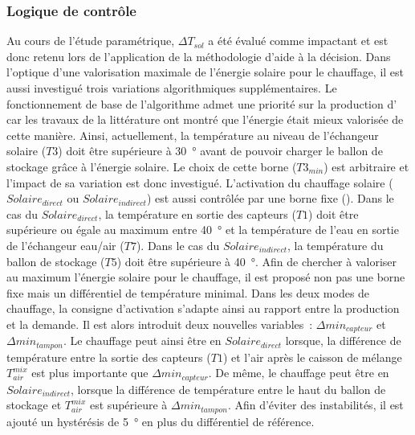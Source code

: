 \subsubsection{Logique de contrôle} %
\label{ssub:logique_de_controle}
Au cours de l’étude paramétrique, $\Delta T_{sol}$ a été évalué comme impactant et est
donc retenu lors de l’application de la méthodologie d’aide à la décision. Dans l’optique
d’une valorisation maximale de l’énergie solaire pour le chauffage, il est aussi
investigué trois variations algorithmiques supplémentaires. Le fonctionnement de base de
l’algorithme admet une priorité sur la production d’ car les travaux de la
littérature ont montré que l’énergie était mieux valorisée de cette manière. Ainsi,
actuellement, la température au niveau de l’échangeur solaire ($T3$) doit être supérieure
à \SI{30}{\degree} avant de pouvoir charger le ballon de stockage grâce à l’énergie solaire. Le
choix de cette borne ($T3_{min}$) est arbitraire et l’impact de sa variation est donc
investigué. L’activation du chauffage solaire ($Solaire_{direct}$ ou $Solaire_{indirect}$)
est aussi contrôlée par une borne fixe (). Dans le cas
du $Solaire_{direct}$, la température en sortie des capteurs ($T1$) doit être supérieure ou
égale au maximum entre \SI{40}{\degree} et la température de l’eau en sortie de
l’échangeur eau/air ($T7$). Dans le cas du $Solaire_{indirect}$, la température du ballon
de stockage ($T5$) doit être supérieure à \SI{40}{\degree}. Afin de chercher à valoriser au
maximum l’énergie solaire pour le chauffage, il est proposé non pas une borne fixe mais un
différentiel de température minimal. Dans les deux modes de chauffage, la consigne
d’activation s’adapte ainsi au rapport entre la production et la demande. Il est alors
introduit deux nouvelles variables~: $\Delta min_{capteur}$ et $\Delta min_{tampon}$. Le
chauffage peut ainsi être en $Solaire_{direct}$ lorsque, la différence de température
entre la sortie des capteurs ($T1$) et l’air après le caisson de mélange $T_{air}^{mix}$
est plus importante que $\Delta min_{capteur}$. De même, le chauffage peut être en
$Solaire_{indirect}$, lorsque la différence de température entre le haut du ballon de stockage
et $T_{air}^{mix}$ est supérieure à $\Delta min_{tampon}$. Afin d’éviter des instabilités,
il est ajouté un hystérésis de \SI{5}{\degree} en plus du différentiel de référence.



